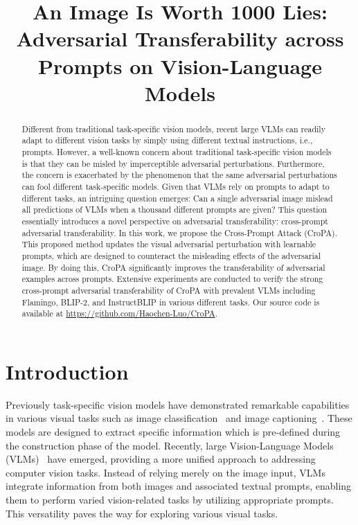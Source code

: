\title{An Image Is Worth 1000 Lies: Adversarial Transferability across Prompts on Vision-Language Models}



\maketitle

\begin{abstract}
Different from traditional task-specific vision models, recent large VLMs can readily adapt to different vision tasks by simply using different textual instructions, i.e., prompts. However, a well-known concern about traditional task-specific vision models is that they can be misled by imperceptible adversarial perturbations. Furthermore, the concern is exacerbated by the phenomenon that the same adversarial perturbations can fool different task-specific models. Given that VLMs rely on prompts to adapt to different tasks, an intriguing question emerges: Can a single adversarial image mislead all predictions of VLMs when a thousand different prompts are given? This question essentially introduces a novel perspective on adversarial transferability: cross-prompt adversarial transferability. In this work, we propose the Cross-Prompt Attack (CroPA). This proposed method updates the visual adversarial perturbation with learnable prompts, which are designed to counteract the misleading effects of the adversarial image. By doing this, CroPA significantly improves the transferability of adversarial examples across prompts. Extensive experiments are conducted to verify the strong cross-prompt adversarial transferability of CroPA with prevalent VLMs including Flamingo, BLIP-2, and InstructBLIP in various different tasks. Our source code is available at \url{https://github.com/Haochen-Luo/CroPA}.
\end{abstract}

\section{Introduction}
Previously task-specific vision models have demonstrated remarkable capabilities in various visual tasks such as image classification~\citep{he2016deep} and image captioning~\citep{yao2018exploring,yang2019auto}. These models are designed to extract specific information which is pre-defined during the construction phase of the model. Recently, large Vision-Language Models (VLMs)~\citep{gu2023systematic,li2022blip,alayrac2022flamingo,li2023blip,zhu2023minigpt} have emerged, providing a more unified approach to addressing computer vision tasks. Instead of relying merely on the image input, VLMs integrate information from both images and associated textual prompts, enabling them to perform varied vision-related tasks by utilizing appropriate prompts. This versatility paves the way for exploring various visual tasks.

